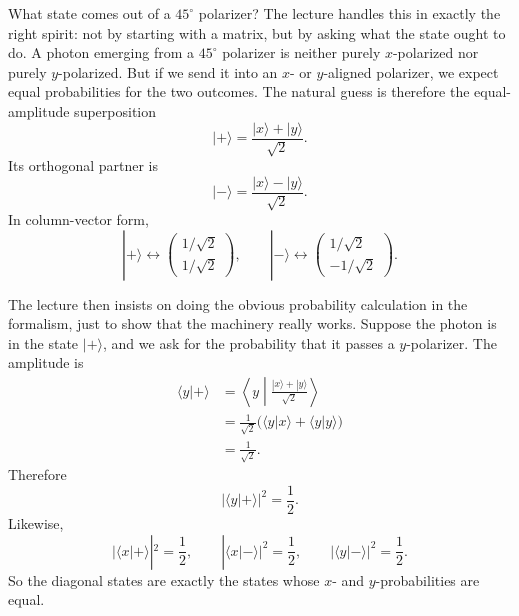 What state comes out of a \(45^\circ\) polarizer? The lecture handles this in exactly the right spirit: not by starting with a matrix, but by asking what the state ought to do. A photon emerging from a \(45^\circ\) polarizer is neither purely \(x\)-polarized nor purely \(y\)-polarized. But if we send it into an \(x\)- or \(y\)-aligned polarizer, we expect equal probabilities for the two outcomes. The natural guess is therefore the equal-amplitude superposition
\begin{equation}
|+\rangle=\frac{|x\rangle+|y\rangle}{\sqrt2}.
\end{equation}
Its orthogonal partner is
\begin{equation}
|-\rangle=\frac{|x\rangle-|y\rangle}{\sqrt2}.
\end{equation}
In column-vector form,
\begin{equation}
|+\rangle \leftrightarrow
\begin{pmatrix}
1/\sqrt2\\
1/\sqrt2
\end{pmatrix},
\qquad
|-\rangle \leftrightarrow
\begin{pmatrix}
1/\sqrt2\\
-1/\sqrt2
\end{pmatrix}.
\end{equation}

The lecture then insists on doing the obvious probability calculation in the formalism, just to show that the machinery really works. Suppose the photon is in the state \(|+\rangle\), and we ask for the probability that it passes a \(y\)-polarizer. The amplitude is
\begin{align}
\langle y|+\rangle
&=
\left\langle y\middle|
\frac{|x\rangle+|y\rangle}{\sqrt2}
\right\rangle \\
&=
\frac{1}{\sqrt2}
\bigl(\langle y|x\rangle+\langle y|y\rangle\bigr) \\
&=
\frac{1}{\sqrt2}.
\end{align}
Therefore
\begin{equation}
|\langle y|+\rangle|^2=\frac12.
\end{equation}
Likewise,
\begin{equation}
|\langle x|+\rangle|^2=\frac12,
\qquad
|\langle x|-\rangle|^2=\frac12,
\qquad
|\langle y|-\rangle|^2=\frac12.
\end{equation}
So the diagonal states are exactly the states whose \(x\)- and \(y\)-probabilities are equal.

